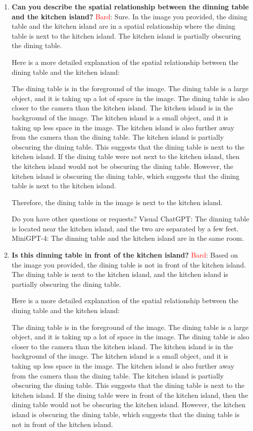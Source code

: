 \begin{enumerate}
    \item \textbf{Can you describe the spatial relationship between the dinning table and the kitchen island?}
    \subitem \textcolor{Red}{Bard}: 
    Sure. In the image you provided, the dining table and the kitchen island are in a spatial relationship where the dining table is next to the kitchen island. The kitchen island is partially obscuring the dining table.
    
    Here is a more detailed explanation of the spatial relationship between the dining table and the kitchen island:
    
    The dining table is in the foreground of the image. The dining table is a large object, and it is taking up a lot of space in the image. The dining table is also closer to the camera than the kitchen island.
    The kitchen island is in the background of the image. The kitchen island is a small object, and it is taking up less space in the image. The kitchen island is also further away from the camera than the dining table.
    The kitchen island is partially obscuring the dining table. This suggests that the dining table is next to the kitchen island.
    If the dining table were not next to the kitchen island, then the kitchen island would not be obscuring the dining table. However, the kitchen island is obscuring the dining table, which suggests that the dining table is next to the kitchen island.
    
    Therefore, the dining table in the image is next to the kitchen island.
    
    Do you have other questions or requests?
    \subitem Visual ChatGPT: The dinning table is located near the kitchen island, and the two are separated by a few feet.
    \subitem MiniGPT-4: The dinning table and the kitchen island are in the same room.
    \item \textbf{Is this dinning table in front of the kitchen island?}
    \subitem \textcolor{Red}{Bard}: Based on the image you provided, the dining table is not in front of the kitchen island. The dining table is next to the kitchen island, and the kitchen island is partially obscuring the dining table.

    Here is a more detailed explanation of the spatial relationship between the dining table and the kitchen island:
    
    The dining table is in the foreground of the image. The dining table is a large object, and it is taking up a lot of space in the image. The dining table is also closer to the camera than the kitchen island.
    The kitchen island is in the background of the image. The kitchen island is a small object, and it is taking up less space in the image. The kitchen island is also further away from the camera than the dining table.
    The kitchen island is partially obscuring the dining table. This suggests that the dining table is next to the kitchen island.
    If the dining table were in front of the kitchen island, then the dining table would not be obscuring the kitchen island. However, the kitchen island is obscuring the dining table, which suggests that the dining table is not in front of the kitchen island.
    

\end{enumerate}
